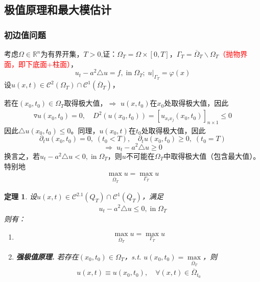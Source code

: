 \documentclass[11pt, a4paper]{article}
\theoremstyle{theorem}
\newtheorem{thm}{定理}[section]
\begin{document}
\subsection{极值原理和最大模估计}

\subsubsection{初边值问题}

考虑$\Omega \in \mathbb{R}^n$为有界开集，$T>0$,证：$\Omega_T = \Omega \times [0,T]$，$\Gamma_T = \overline{\Omega}_T \backslash \Omega_T$\textcolor{red}{（抛物界面，即下底面+柱面）}，
$$
u_t - a^2 \triangle u = f, \; \text{in} \; \Omega_T; \; u\bigg|_{\Gamma_T} = \varphi(x)
$$
设$u(x,t) \in \mathcal{C}^{2} (\Omega_T) \cap \mathcal{C}^1(\overline{\Omega}_T)$，

若在$(x_0, t_0) \in \Omega_T$取得极大值，$\Longrightarrow$ $u(x,t_0)$在$x_0$处取得极大值，因此
\begin{align*}
    \triangledown u(x_0,t_0) = 0, \quad D^2(u(x_0,t_0)) = \left[u_{x_i x_j}(x_0,t_0) \right]_{n \times 1} \leq 0
\end{align*}
因此$\triangle u(x_0,t_0) \leq 0$。同理，$u(x_0,t)$在$t_0$处取得极大值，因此
$$
\partial_t u(x_0,t_0) = 0, \;  (t_0 < T), \quad \partial_t u(x_0,t_0) \geq 0, \;  (t_0 = T)
$$
$$
\Longrightarrow \; u_t - a^2 \triangle u \geq 0
$$
换言之，若$u_t - a^2 \triangle u < 0, \; \text{in} \; \Omega_T$，则$u$不可能在$\Omega_T$中取得极大值（包含最大值）。特别地
\begin{align}
\label{equa4-7-1}
    \max\limits_{\overline{\Omega}_T} u = \max\limits_{\Gamma_T} u
\end{align}

\begin{thm}
\label{thm-4-7}
设$u(x,t) \in \mathcal{C}^{2.1} (Q_T) \cap \mathcal{C}^1(\overline{Q}_T)$，满足
\begin{align}
    u_t - a^2 \triangle u \leq 0, \; \text{in} \; \Omega_T
\end{align}
则有：
\begin{enumerate}[(1)]
  \item
  \begin{align}
      \max\limits_{\overline{\Omega}_T} u = \max\limits_{\Gamma_T} u
  \end{align}
  \item \textbf{强极值原理.} 若存在$(x_0,t_0) \in \Omega_T$，s.t. $u(x_0,t_0) = \max\limits_{\overline{\Omega}_T}$，则
  \begin{align}
      u(x,t) \equiv u(x_0,t_0), \quad \forall (x,t) \in \overline{\Omega}_{t_0}
  \end{align}

\end{enumerate}
\end{thm}
\end{document}
